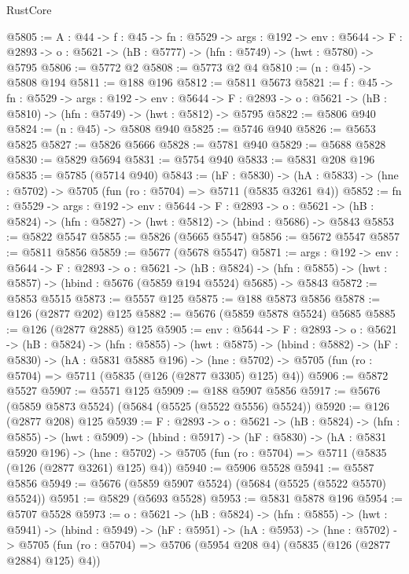 \begin{lexlean}{RustCore}
\begin{coremodule}
@5805 := {A : @44} ->
  {f : @45} ->
  {fn : @5529} ->
  {args : @192} ->
  {env : @5644} ->
  {F : @2893} -> {o : @5621} -> (hB : @5777) -> (hfn : @5749) -> (hwt : @5780) -> @5795
@5806 := @5772 @2
@5808 := @5773 @2 @4
@5810 := (n : @45) -> @5808 @194
@5811 := @188 @196
@5812 := @5811 @5673
@5821 := {f : @45} ->
  {fn : @5529} ->
  {args : @192} ->
  {env : @5644} ->
  {F : @2893} -> {o : @5621} -> (hB : @5810) -> (hfn : @5749) -> (hwt : @5812) -> @5795
@5822 := @5806 @940
@5824 := (n : @45) -> @5808 @940
@5825 := @5746 @940
@5826 := @5653 @5825
@5827 := @5826 @5666
@5828 := @5781 @940
@5829 := @5688 @5828
@5830 := @5829 @5694
@5831 := @5754 @940
@5833 := @5831 @208 @196
@5835 := @5785 (@5714 @940)
@5843 := (hF : @5830) ->
  (hA : @5833) -> (hne : @5702) -> @5705 (fun (ro : @5704) => @5711 (@5835 @3261 @4))
@5852 := {fn : @5529} ->
  {args : @192} ->
  {env : @5644} ->
  {F : @2893} ->
  {o : @5621} -> (hB : @5824) -> (hfn : @5827) -> (hwt : @5812) -> (hbind : @5686) -> @5843
@5853 := @5822 @5547
@5855 := @5826 (@5665 @5547)
@5856 := @5672 @5547
@5857 := @5811 @5856
@5859 := @5677 (@5678 @5547)
@5871 := {args : @192} ->
  {env : @5644} ->
  {F : @2893} ->
  {o : @5621} ->
  (hB : @5824) ->
  (hfn : @5855) -> (hwt : @5857) -> (hbind : @5676 (@5859 @194 @5524) @5685) -> @5843
@5872 := @5853 @5515
@5873 := @5557 @125
@5875 := @188 @5873 @5856
@5878 := @126 (@2877 @202) @125
@5882 := @5676 (@5859 @5878 @5524) @5685
@5885 := @126 (@2877 @2885) @125
@5905 := {env : @5644} ->
  {F : @2893} ->
  {o : @5621} ->
  (hB : @5824) ->
  (hfn : @5855) ->
  (hwt : @5875) ->
  (hbind : @5882) ->
  (hF : @5830) ->
  (hA : @5831 @5885 @196) ->
  (hne : @5702) -> @5705 (fun (ro : @5704) => @5711 (@5835 (@126 (@2877 @3305) @125) @4))
@5906 := @5872 @5527
@5907 := @5571 @125
@5909 := @188 @5907 @5856
@5917 := @5676 (@5859 @5873 @5524) (@5684 (@5525 (@5522 @5556) @5524))
@5920 := @126 (@2877 @208) @125
@5939 := {F : @2893} ->
  {o : @5621} ->
  (hB : @5824) ->
  (hfn : @5855) ->
  (hwt : @5909) ->
  (hbind : @5917) ->
  (hF : @5830) ->
  (hA : @5831 @5920 @196) ->
  (hne : @5702) -> @5705 (fun (ro : @5704) => @5711 (@5835 (@126 (@2877 @3261) @125) @4))
@5940 := @5906 @5528
@5941 := @5587 @5856
@5949 := @5676 (@5859 @5907 @5524) (@5684 (@5525 (@5522 @5570) @5524))
@5951 := @5829 (@5693 @5528)
@5953 := @5831 @5878 @196
@5954 := @5707 @5528
@5973 := {o : @5621} ->
  (hB : @5824) ->
  (hfn : @5855) ->
  (hwt : @5941) ->
  (hbind : @5949) ->
  (hF : @5951) ->
  (hA : @5953) ->
  (hne : @5702) ->
  @5705 (fun (ro : @5704) => @5706 (@5954 @208 @4) (@5835 (@126 (@2877 @2884) @125) @4))

\end{coremodule}
\end{lexlean}
